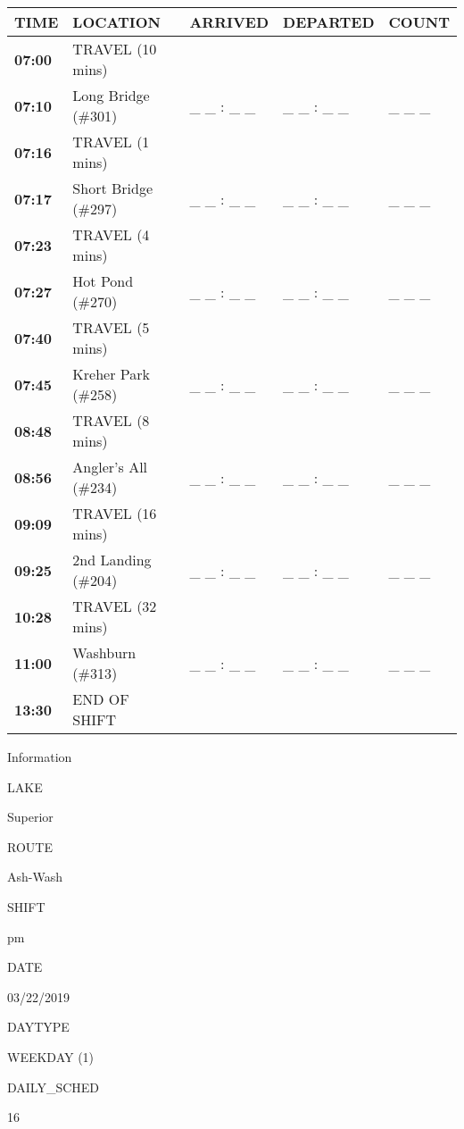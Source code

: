 \documentclass[]{article}
\begin{document}
\begin{tabular}{>{\bfseries}lllll}
\toprule
\textbf{TIME} & \textbf{LOCATION} & \textbf{ARRIVED} & \textbf{DEPARTED} & \textbf{COUNT}\\
\midrule
07:00 & TRAVEL (10 mins) &  &  & \\
07:10 & Long Bridge (\#301) & \_ \_ : \_ \_ & \_ \_ : \_ \_ & \_ \_ \_\\
07:16 & TRAVEL (1 mins) &  &  & \\
07:17 & Short Bridge (\#297) & \_ \_ : \_ \_ & \_ \_ : \_ \_ & \_ \_ \_\\
07:23 & TRAVEL (4 mins) &  &  & \\
07:27 & Hot Pond (\#270) & \_ \_ : \_ \_ & \_ \_ : \_ \_ & \_ \_ \_\\
07:40 & TRAVEL (5 mins) &  &  & \\
07:45 & Kreher Park (\#258) & \_ \_ : \_ \_ & \_ \_ : \_ \_ & \_ \_ \_\\
08:48 & TRAVEL (8 mins) &  &  & \\
08:56 & Angler's All (\#234) & \_ \_ : \_ \_ & \_ \_ : \_ \_ & \_ \_ \_\\
09:09 & TRAVEL (16 mins) &  &  & \\
09:25 & 2nd Landing (\#204) & \_ \_ : \_ \_ & \_ \_ : \_ \_ & \_ \_ \_\\
10:28 & TRAVEL (32 mins) &  &  & \\
11:00 & Washburn (\#313) & \_ \_ : \_ \_ & \_ \_ : \_ \_ & \_ \_ \_\\
13:30 & END OF SHIFT &  &  & \\
\bottomrule
\end{tabular}\newpage

Information

LAKE

Superior

ROUTE

Ash-Wash

SHIFT

pm

DATE

03/22/2019

DAYTYPE

WEEKDAY (1)

DAILY\_SCHED

16

\vspace{24pt}
\end{document}
